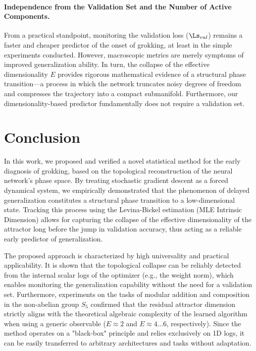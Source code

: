 \documentclass{article}
\begin{document}
\paragraph{Independence from the Validation Set and the Number of Active Components.}
From a practical standpoint, monitoring the validation loss ($\Ls_{val}$) remains a faster and cheaper predictor of the onset of grokking, at least in the simple experiments conducted. However, macroscopic metrics are merely symptoms of improved generalization ability. In turn, the collapse of the effective dimensionality $E$ provides rigorous mathematical evidence of a structural phase transition—a process in which the network truncates noisy degrees of freedom and compresses the trajectory into a compact submanifold. Furthermore, our dimensionality-based predictor fundamentally does not require a validation set. 



\section{Conclusion}\label{sec:concl}

In this work, we proposed and verified a novel statistical method for the early diagnosis of grokking, based on the topological reconstruction of the neural network’s phase space. By treating stochastic gradient descent as a forced dynamical system, we empirically demonstrated that the phenomenon of delayed generalization constitutes a structural phase transition to a low-dimensional state. Tracking this process using the Levina-Bickel estimation (MLE Intrinsic Dimension) allows for capturing the collapse of the effective dimensionality of the attractor long before the jump in validation accuracy, thus acting as a reliable early predictor of generalization.

The proposed approach is characterized by high universality and practical applicability. It is shown that the topological collapse can be reliably detected from the internal scalar logs of the optimizer (e.g., the weight norm), which enables monitoring the generalization capability without the need for a validation set. Furthermore, experiments on the tasks of modular addition and composition in the non-abelian group $S_5$ confirmed that the residual attractor dimension strictly aligns with the theoretical algebraic complexity of the learned algorithm when using a generic observable ($E \approx 2$ and $E \approx 4 \dots 6$, respectively). Since the method operates on a "black-box" principle and relies exclusively on 1D logs, it can be easily transferred to arbitrary architectures and tasks without adaptation.
\end{document}
